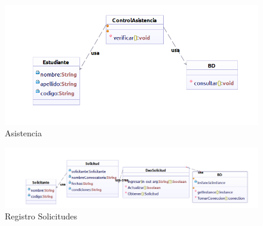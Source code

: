 \newpage

\begin{figure}[th!]
	\centering
	\includegraphics[width=1\linewidth]{uml/Clases/Asistencia}
	\caption{Asistencia}
	\label{fig:Asistencia}
\end{figure}

\newpage

\begin{figure}[th!]
	\centering
	\includegraphics[width=1.2\linewidth]{fis/fis/uml/Clases/Solicitud}
	\caption{Registro Solicitudes}
	\label{fig:Registro Solicitudes}
\end{figure}
